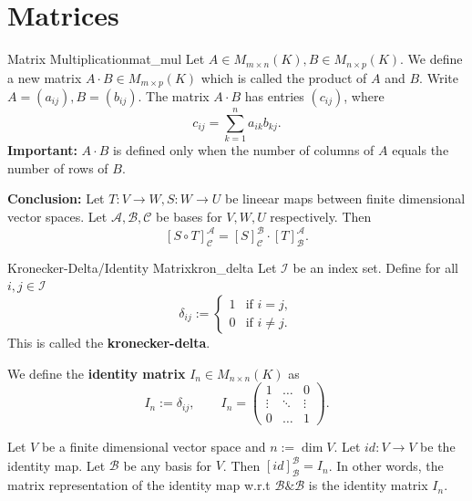 % 
%
%
%

\section{Matrices}

\begin{definition}{Matrix Multiplication}{mat_mul}
	Let $A \in M_{m \times n}(K), B \in M_{n \times p}(K)$. We define a new matrix $A \cdot B \in M_{m \times p}(K)$ which is called the product of $A$ and $B$. Write $A = (a_{ij}), B = (b_{ij})$. The matrix $A \cdot B$ has entries $(c_{ij})$, where
	\[
	c_{ij} = \sum_{k=1}^{n} a_{ik}b_{kj}.
	\]
	\textbf{Important:} $A \cdot B$ is defined only when the number of columns of $A$ equals the number of rows of $B$.
\end{definition}

\textbf{Conclusion:} Let $T:V \to W, S:W \to U$ be lineear maps between finite dimensional vector spaces. Let $\mathcal{A}, \mathcal{B}, \mathcal{C}$ be bases for $V, W, U$ respectively. Then
\[
[S \circ T]^{\mathcal{A}}_{\mathcal{C}} = [S]^{\mathcal{B}}_{\mathcal{C}}\cdot [T]^{\mathcal{A}}_{\mathcal{B}}.
\]

\begin{definition}{Kronecker-Delta/Identity Matrix}{kron_delta}
	Let $\mathcal{I}$ be an index set. Define for all $i, j \in \mathcal{I}$
	\[
	\delta_{ij} := \begin{cases}
		1 & \text{if }i = j,\\
		0 & \text{if }i \neq j.
	\end{cases}
	\]
	This is called the \textbf{kronecker-delta}.
	
	We define the \textbf{identity matrix} $I_n \in M_{n \times n}(K)$ as
	\[
	I_n := \delta_{ij}, \qquad I_n = \begin{pmatrix}
		1 & \hdots & 0\\
		\vdots & \ddots & \vdots \\
		0 & \hdots & 1
	\end{pmatrix}.
	\]
\end{definition}

\begin{remark}
	Let $V$ be a finite dimensional vector space and $n := \dim V$. Let $id:V \to V$ be the identity map. Let $\mathcal{B}$ be any basis for $V$. Then $[id]^{\mathcal{B}}_\mathcal{B} = I_n$. In other words, the matrix representation of the identity map w.r.t $\mathcal{B} \& \mathcal{B}$ is the identity matrix $I_n$.
\end{remark}

